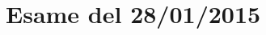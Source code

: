\documentclass[\main/main.tex]{subfiles}
\begin{document}
\section{Esame del 28/01/2015}

\end{document}
